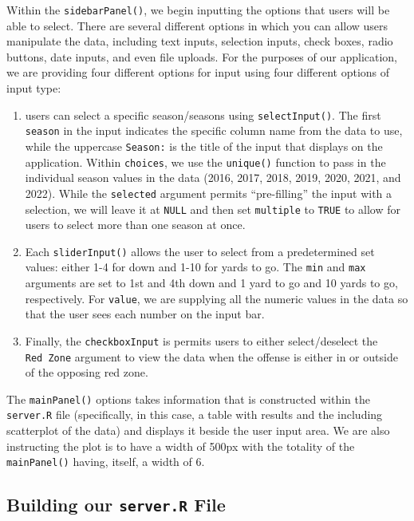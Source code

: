 \documentclass[
  letterpaper,
]{krantz}
\providecommand{\tightlist}{%
  \setlength{\itemsep}{0pt}\setlength{\parskip}{0pt}}\usepackage{longtable,booktabs,array}
\begin{document}
Within the \texttt{sidebarPanel()}, we begin inputting the options that
users will be able to select. There are several different options in
which you can allow users manipulate the data, including text inputs,
selection inputs, check boxes, radio buttons, date inputs, and even file
uploads. For the purposes of our application, we are providing four
different options for input using four different options of input type:

\begin{enumerate}
\def\labelenumi{\arabic{enumi}.}
\tightlist
\item
  users can select a specific season/seasons using
  \texttt{selectInput()}. The first \texttt{season} in the input
  indicates the specific column name from the data to use, while the
  uppercase \texttt{Season:} is the title of the input that displays on
  the application. Within \texttt{choices}, we use the \texttt{unique()}
  function to pass in the individual season values in the data (2016,
  2017, 2018, 2019, 2020, 2021, and 2022). While the \texttt{selected}
  argument permits ``pre-filling'' the input with a selection, we will
  leave it at \texttt{NULL} and then set \texttt{multiple} to
  \texttt{TRUE} to allow for users to select more than one season at
  once.
\item
  Each \texttt{sliderInput()} allows the user to select from a
  predetermined set values: either 1-4 for down and 1-10 for yards to
  go. The \texttt{min} and \texttt{max} arguments are set to 1st and 4th
  down and 1 yard to go and 10 yards to go, respectively. For
  \texttt{value}, we are supplying all the numeric values in the data so
  that the user sees each number on the input bar.
\item
  Finally, the \texttt{checkboxInput} is permits users to either
  select/deselect the \texttt{Red\ Zone} argument to view the data when
  the offense is either in or outside of the opposing red zone.
\end{enumerate}

The \texttt{mainPanel()} options takes information that is constructed
within the \texttt{server.R} file (specifically, in this case, a table
with results and the including scatterplot of the data) and displays it
beside the user input area. We are also instructing the plot is to have
a width of 500px with the totality of the \texttt{mainPanel()} having,
itself, a width of 6.

\hypertarget{building-our-server.r-file}{%
\subsection{\texorpdfstring{Building our \texttt{server.R}
File}{Building our server.R File}}\label{building-our-server.r-file}}
\end{document}
